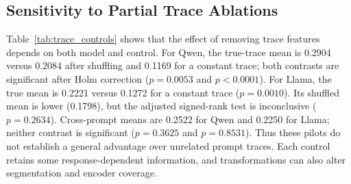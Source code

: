 \documentclass[electronics,article,submit,pdftex,moreauthors]{Definitions/mdpi}
\begin{document}
\subsection{Sensitivity to Partial Trace Ablations}
Table~\ref{tab:trace_controls} shows that the effect of removing trace features depends on both model and control. For Qwen, the true-trace mean is 0.2904 versus 0.2084 after shuffling and 0.1169 for a constant trace; both contrasts are significant after Holm correction ($p=0.0053$ and $p<0.0001$). For Llama, the true mean is 0.2221 versus 0.1272 for a constant trace ($p=0.0010$). Its shuffled mean is lower (0.1798), but the adjusted signed-rank test is inconclusive ($p=0.2634$). Cross-prompt means are 0.2522 for Qwen and 0.2250 for Llama; neither contrast is significant ($p=0.3625$ and $p=0.8531$). Thus these pilots do not establish a general advantage over unrelated prompt traces. Each control retains some response-dependent information, and transformations can also alter segmentation and encoder coverage.

\begin{table}[ht]
\centering
\caption{Partial trace ablations using logged token-byte lengths from the 96-token pilot ($n=30$ prompts per model and condition). Each run decodes up to three heuristic segments with three samples per segment, 80-token T5 input and output limits, and the full stored response as reference. Intervals are percentile-bootstrap 95\% confidence intervals for the mean.}
\label{tab:trace_controls}
\end{table}
\end{document}
